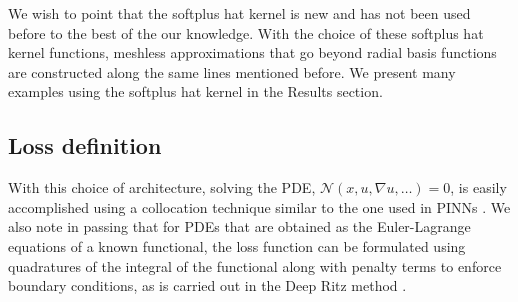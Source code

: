 \documentclass[12pt]{article}
\begin{document}
We wish to point that the softplus hat kernel is new and has not been used before to the best of the our knowledge. With the choice of these softplus hat kernel functions, meshless approximations that go beyond radial basis functions are constructed along the same lines mentioned before. We present many examples using the softplus hat kernel in the Results section.

\subsection{Loss definition}
With this choice of architecture, solving the PDE, $\mathcal{N}(x, u, \nabla u, \ldots) = 0$, is easily accomplished using a collocation technique similar to the one used in PINNs \cite{RPK2019}. We also note in passing that for PDEs that are obtained as the Euler-Lagrange equations of a known functional, the loss function can be formulated using quadratures of the integral of the functional along with penalty terms to enforce boundary conditions, as is carried out in the Deep Ritz method \cite{EYu2018}.
\end{document}
